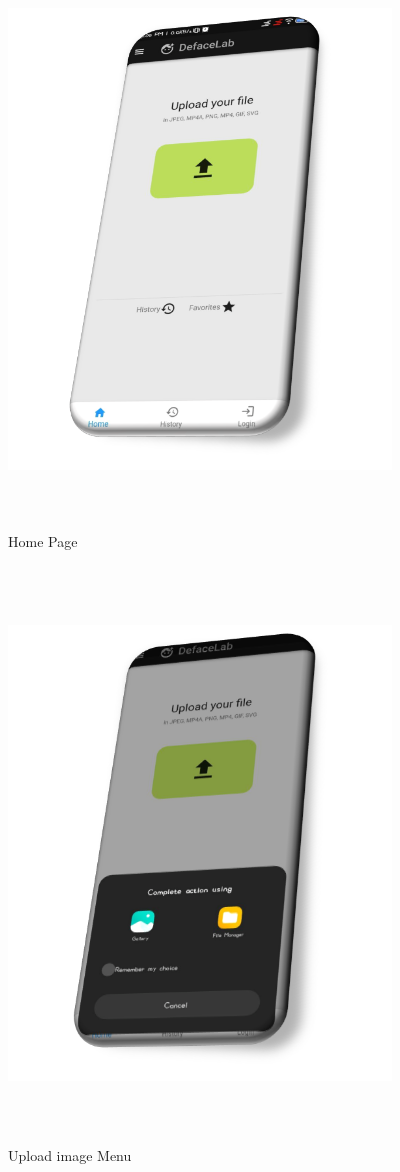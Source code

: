 \begin{figure}[ht]
    \centering
    \includegraphics[width= 4in,height =6in ]{img/homepagev2.png}
    \caption{Home Page}
\end{figure}

\begin{figure}[ht]
    \centering
    \includegraphics[width= 4in,height =6in ]{img/uploaderv2.png}
    \caption{Upload image Menu}
\end{figure}
